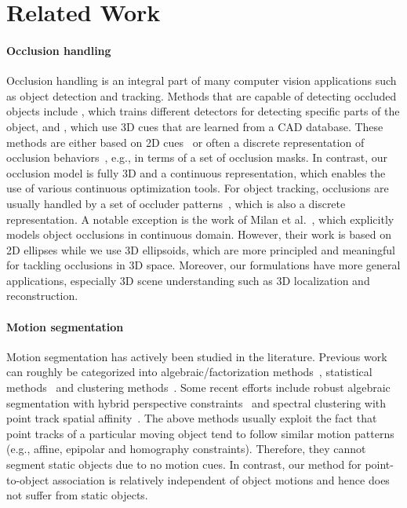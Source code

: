 \section{Related Work}
\label{sec:related}

\paragraph{Occlusion handling} 
Occlusion handling is an integral part of many computer vision applications such as object detection and tracking. Methods that are capable of detecting occluded objects include \cite{Gao_etal_2011}, which trains different detectors for detecting specific parts of the object, and \cite{Pepik_etal_2013,Xiang_Savarese_2013}, which use 3D cues that are learned from a CAD database. These methods are either based on 2D cues~\cite{Gao_etal_2011} or often a discrete representation of occlusion behaviors~\cite{Pepik_etal_2013,Xiang_Savarese_2013}, e.g., in terms of a set of occlusion masks. In contrast, our occlusion model is fully 3D and a continuous representation, which enables the use of various continuous optimization tools. For object tracking, occlusions are usually handled by a set of occluder patterns~\cite{Kwak_etal_2012,Wu_Nevatia_2007}, which is also a discrete representation. A notable exception is the work of Milan et al.~\cite{Milan_etal_2014}, which explicitly models object occlusions in continuous domain. However, their work is based on 2D ellipses while we use 3D ellipsoids, which are more principled and meaningful for tackling occlusions in 3D space. Moreover, our formulations have more general applications, especially 3D scene understanding such as 3D localization and reconstruction.

\paragraph{Motion segmentation}
Motion segmentation has actively been studied in the literature. Previous work can roughly be categorized into algebraic/factorization methods~\cite{Costeria98,Vidal03,Vidal04}, statistical methods~\cite{Kanatani01,Gruber04,Rao08} and clustering methods~\cite{Yan06,Goh07}. Some recent efforts include robust algebraic segmentation with hybrid perspective constraints~\cite{Rao_etal_2010} and spectral clustering with point track spatial affinity~\cite{Brox_Malik_2010}. The above methods usually exploit the fact that point tracks of a particular moving object tend to follow similar motion patterns (e.g., affine, epipolar and homography constraints). Therefore, they cannot segment static objects due to no motion cues. In contrast, our method for point-to-object association is relatively independent of object motions and hence does not suffer from static objects. 

